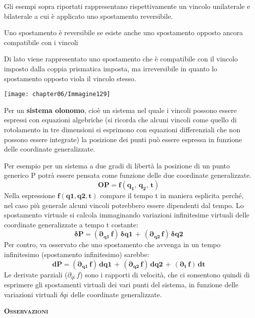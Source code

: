 \begin{itemize}
Gli esempi sopra riportati rappresentano rispettivamente un vincolo unilaterale e bilaterale a cui è applicato uno spostamento reversibile.

\begin{minipage}{.6\textwidth}
Uno spostamento è reversibile se esiste anche uno spostamento opposto ancora compatibile con i vincoli\newline

Di lato viene rappresentato uno spostamento che è compatibile con il vincolo imposto dalla coppia prismatica imposta, ma irreversibile in quanto lo spostamento opposto viola il vincolo stesso.
\end{minipage}
\hfill
\begin{minipage}{.35\textwidth}
\centering
\texttt{[image: chapter06/Immagine129]}
\end{minipage}

Per un \textbf{sistema olonomo}, cioè un sistema nel quale i vincoli possono essere espressi con equazioni algebriche  (si ricorda che alcuni vincoli come quello di rotolamento in tre dimensioni si esprimono con equazioni differenziali  che non possono essere integrate) la posizione dei punti può essere espressa in funzione delle coordinate generalizzate.

Per esempio per un sistema a due gradi di libertà la posizione di un punto generico P potrà essere pensata come funzione delle due coordinate generalizzate.
\[\mathbf{OP = f(q_1,\,q_2,\,t)}\]
Nella espressione $\mathbf{f(q1,q2,t)}$ compare il tempo t in maniera esplicita perché, nel caso più generale alcuni vincoli potrebbero essere dipendenti dal tempo.
Lo spostamento virtuale si calcola immaginando variazioni infinitesime virtuali delle coordinate generalizzate a tempo t costante:
\[\mathbf{\delta	P = (\partial_{q1}\,f)\,\delta q1\,+\,(\partial_{q2}\,f)\,\delta q2}\]
Per contro, va osservato che uno spostamento che avvenga in un tempo infinitesimo (spostamento infinitesimo) sarebbe:
\[\mathbf{dP = (\partial_{q1}\,f)\,dq1\,+\,(\partial_{q2}\,f)\,dq2\,+\,(\partial_t\,f)\,dt}\]
Le derivate parziali ($\partial_{qi}\,f$) sono i rapporti di velocità, che ci sonsentono quindi di esprimere gli spostamenti virtuali dei vari punti del sistema, in funzione delle variazioni virtuali $\delta qi$ delle coordinate generalizzate.
	\end{itemize}
	
	\begin{center}
	{\scshape{\bfseries Osservazioni}}
	\end{center}
	
